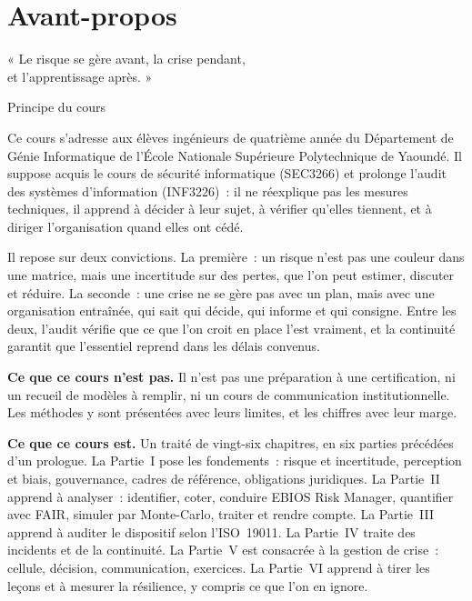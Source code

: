 
\chapter*{Avant-propos}

\epigraph{« Le risque se gère avant, la crise pendant,\\
et l'apprentissage après. »}{Principe du cours}

Ce cours s'adresse aux élèves ingénieurs de quatrième année du Département
de Génie Informatique de l'École Nationale Supérieure Polytechnique de
Yaoundé. Il suppose acquis le cours de sécurité informatique (SEC3266) et
prolonge l'audit des systèmes d'information (INF3226)~: il ne réexplique pas
les mesures techniques, il apprend à décider à leur sujet, à vérifier
qu'elles tiennent, et à diriger l'organisation quand elles ont cédé.

Il repose sur deux convictions. La première~: un risque n'est pas une
couleur dans une matrice, mais une incertitude sur des pertes, que l'on
peut estimer, discuter et réduire. La seconde~: une crise ne se gère pas
avec un plan, mais avec une organisation entraînée, qui sait qui décide,
qui informe et qui consigne. Entre les deux, l'audit vérifie que ce que
l'on croit en place l'est vraiment, et la continuité garantit que
l'essentiel reprend dans les délais convenus.

\bigskip

\textbf{Ce que ce cours n'est pas.} Il n'est pas une préparation à une
certification, ni un recueil de modèles à remplir, ni un cours de
communication institutionnelle. Les méthodes y sont présentées avec leurs
limites, et les chiffres avec leur marge.

\bigskip

\textbf{Ce que ce cours est.} Un traité de vingt-six chapitres, en six
parties précédées d'un prologue. La Partie~I pose les fondements~: risque
et incertitude, perception et biais, gouvernance, cadres de référence,
obligations juridiques. La Partie~II apprend à analyser~: identifier,
coter, conduire EBIOS Risk Manager, quantifier avec FAIR, simuler par
Monte-Carlo, traiter et rendre compte. La Partie~III apprend à auditer le
dispositif selon l'ISO~19011. La Partie~IV traite des incidents et de la
continuité. La Partie~V est consacrée à la gestion de crise~: cellule,
décision, communication, exercices. La Partie~VI apprend à tirer les leçons
et à mesurer la résilience, y compris ce que l'on en ignore.

